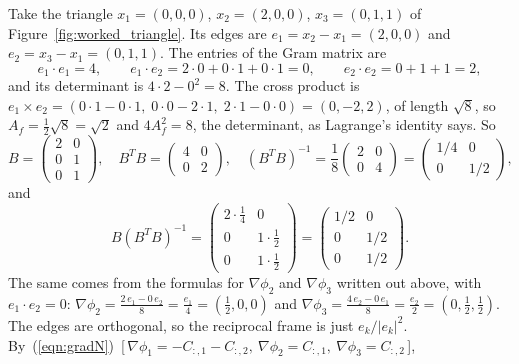\begin{example}
\label{ex:triangle}
Take the triangle $x_1 = (0, 0, 0)$, $x_2 = (2, 0, 0)$, $x_3 = (0, 1, 1)$ of Figure~\ref{fig:worked_triangle}. Its edges are $e_1 = x_2 - x_1 = (2, 0, 0)$ and $e_2 = x_3 - x_1 = (0, 1, 1)$. The entries of the Gram matrix are
\begin{equation*}
e_1\cdot e_1 = 4, \qquad e_1\cdot e_2 = 2\cdot 0 + 0\cdot 1 + 0\cdot 1 = 0, \qquad e_2\cdot e_2 = 0 + 1 + 1 = 2 ,
\end{equation*}
and its determinant is $4\cdot 2 - 0^2 = 8$. The cross product is $e_1\times e_2 = (0\cdot 1 - 0\cdot 1,\; 0\cdot 0 - 2\cdot 1,\; 2\cdot 1 - 0\cdot 0) = (0, -2, 2)$, of length $\sqrt 8$, so $A_f = \frac12\sqrt 8 = \sqrt 2$ and $4A_f^2 = 8$, the determinant, as Lagrange's identity says. So
\begin{equation*}
B = \begin{pmatrix} 2 & 0 \\ 0 & 1 \\ 0 & 1 \end{pmatrix}, \quad B^T B = \begin{pmatrix} 4 & 0 \\ 0 & 2 \end{pmatrix}, \quad (B^TB)^{-1} = \frac18\begin{pmatrix} 2 & 0 \\ 0 & 4\end{pmatrix} = \begin{pmatrix} 1/4 & 0 \\ 0 & 1/2\end{pmatrix},
\end{equation*}
and
\begin{equation*}
B (B^T B)^{-1} = \begin{pmatrix} 2\cdot\frac14 & 0 \\ 0 & 1\cdot\frac12 \\ 0 & 1\cdot\frac12 \end{pmatrix} = \begin{pmatrix} 1/2 & 0 \\ 0 & 1/2 \\ 0 & 1/2 \end{pmatrix}.
\end{equation*}
The same comes from the formulas for $\nabla\phi_2$ and $\nabla\phi_3$ written out above, with $e_1\cdot e_2 = 0$: $\nabla\phi_2 = \frac{2\, e_1 - 0\, e_2}{8} = \frac{e_1}{4} = (\frac12, 0, 0)$ and $\nabla\phi_3 = \frac{4\, e_2 - 0\, e_1}{8} = \frac{e_2}{2} = (0, \frac12, \frac12)$. The edges are orthogonal, so the reciprocal frame is just $e_k / |e_k|^2$. By~(\ref{eqn:gradN})~[\,$\nabla\phi_1 = -C_{:,1} - C_{:,2},\ \nabla\phi_2 = C_{:,1},\ \nabla\phi_3 = C_{:,2}$\,],

\end{example}
